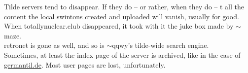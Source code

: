 Tilde servers tend to disappear. If they do -- or rather, when they do -- t all the content the local swintons created and uploaded will vanish, usually for good.\\

When totallynuclear.club disappeared, it took with it the juke box made by $\sim$maze.\\

retronet is gone as well, and so is $\sim$qqwy's tilde-wide search engine.\\

Sometimes, at least the index page of the server is archived, like in the case of \href{http://web.archive.org/web/20141023063037/http://germantil.de/}{germantil.de}. Most user pages are lost, unfortunately.
